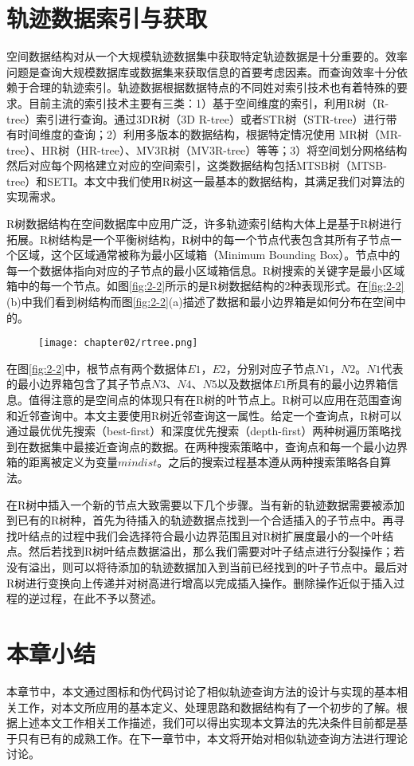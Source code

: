 \section{轨迹数据索引与获取}
\label{sec:index}
空间数据结构对从一个大规模轨迹数据集中获取特定轨迹数据是十分重要的。效率问题是查询大规模数据库或数据集来获取信息的首要考虑因素。而查询效率十分依赖于合理的轨迹索引。轨迹数据根据数据特点的不同姓对索引技术也有着特殊的要求。目前主流的索引技术主要有三类：1）基于空间维度的索引，利用R树（R-tree）索引进行查询。通过3DR树（3D R-tree）或者STR树（STR-tree）进行带有时间维度的查询；2）利用多版本的数据结构，根据特定情况使用 MR树（MR-tree）、HR树（HR-tree）、MV3R树（MV3R-tree）等等；3）将空间划分网格结构然后对应每个网格建立对应的空间索引，这类数据结构包括MTSB树（MTSB-tree）和SETI。本文中我们使用R树这一最基本的数据结构，其满足我们对算法的实现需求。

R树数据结构在空间数据库中应用广泛，许多轨迹索引结构大体上是基于R树进行拓展。R树结构是一个平衡树结构，R树中的每一个节点代表包含其所有子节点一个区域，这个区域通常被称为最小区域箱（Minimum Bounding Box）。节点中的每一个数据体指向对应的子节点的最小区域箱信息。R树搜索的关键字是最小区域箱中的每一个节点。如图\ref{fig:2-2}所示的是R树数据结构的2种表现形式。在\ref{fig:2-2}(b)中我们看到树结构而图\ref{fig:2-2}(a)描述了数据和最小边界箱是如何分布在空间中的。
\\

\begin{figure}[!htp]
  \centering
  \texttt{[image: chapter02/rtree.png]}
\end{figure}

在图\ref{fig:2-2}中，根节点有两个数据体$E1$，$E2$，分别对应子节点$N1$，$N2$。$N1$代表的最小边界箱包含了其子节点$N3$、$N4$、$N5$以及数据体$E1$所具有的最小边界箱信息。值得注意的是空间点的体现只有在R树的叶节点上。R树可以应用在范围查询和近邻查询中。本文主要使用R树近邻查询这一属性。给定一个查询点，R树可以通过最优优先搜索（best-first）和深度优先搜索（depth-first）两种树遍历策略找到在数据集中最接近查询点的数据。在两种搜索策略中，查询点和每一个最小边界箱的距离被定义为变量$mindist$。之后的搜索过程基本遵从两种搜索策略各自算法。

在R树中插入一个新的节点大致需要以下几个步骤。当有新的轨迹数据需要被添加到已有的R树种，首先为待插入的轨迹数据点找到一个合适插入的子节点中。再寻找叶结点的过程中我们会选择符合最小边界范围且对R树扩展度最小的一个叶结点。然后若找到R树叶结点数据溢出，那么我们需要对叶子结点进行分裂操作；若没有溢出，则可以将待添加的轨迹数据加入到当前已经找到的叶子节点中。最后对R树进行变换向上传递并对树高进行增高以完成插入操作。删除操作近似于插入过程的逆过程，在此不予以赘述。
\\

\section{本章小结}
\label{sec:conclusion2}
本章节中，本文通过图标和伪代码讨论了相似轨迹查询方法的设计与实现的基本相关工作，对本文所应用的基本定义、处理思路和数据结构有了一个初步的了解。根据上述本文工作相关工作描述，我们可以得出实现本文算法的先决条件目前都是基于只有已有的成熟工作。在下一章节中，本文将开始对相似轨迹查询方法进行理论讨论。